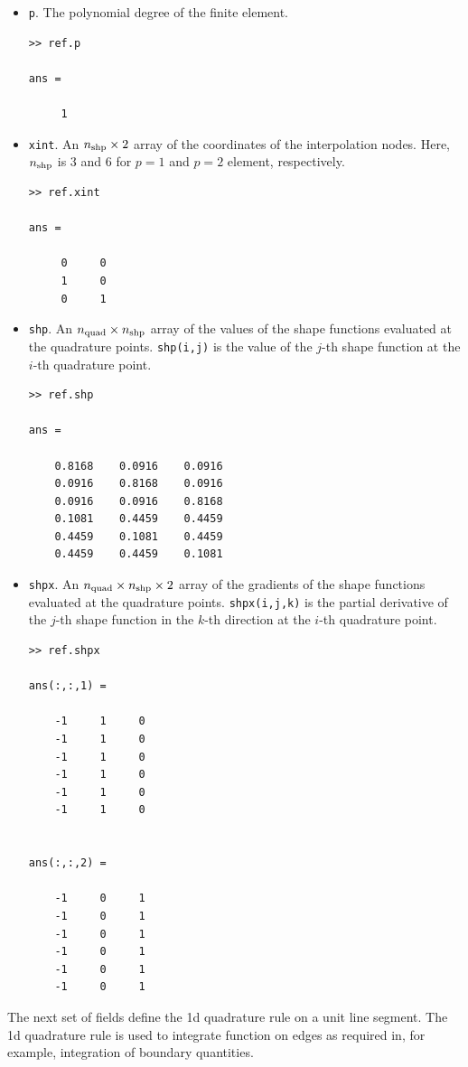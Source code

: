 \documentclass[openany,preprint,11pt]{article}
\begin{document}
\begin{itemize}
\item \texttt{p}. The polynomial degree of the finite element.
\begin{verbatim}
>> ref.p

ans =

     1
\end{verbatim}
\item \texttt{xint}. An $n_{\rm shp} \times 2$ array of the coordinates of the interpolation nodes.  Here, $n_{\rm shp}$ is 3 and 6 for $p=1$ and $p=2$ element, respectively.
\begin{verbatim}
>> ref.xint

ans =

     0     0
     1     0
     0     1
\end{verbatim}
\item \texttt{shp}. An $n_{\rm quad} \times n_{\rm shp}$ array of the values of the shape functions evaluated at the quadrature points. \texttt{shp(i,j)} is the value of the $j$-th shape function at the $i$-th quadrature point.
\begin{verbatim}
>> ref.shp

ans =

    0.8168    0.0916    0.0916
    0.0916    0.8168    0.0916
    0.0916    0.0916    0.8168
    0.1081    0.4459    0.4459
    0.4459    0.1081    0.4459
    0.4459    0.4459    0.1081
\end{verbatim}
\item \texttt{shpx}. An $n_{\rm quad} \times n_{\rm shp} \times 2$ array of the gradients of the shape functions evaluated at the quadrature points. \texttt{shpx(i,j,k)} is the partial derivative of the $j$-th shape function in the $k$-th direction at the $i$-th quadrature point.
\begin{verbatim}
>> ref.shpx

ans(:,:,1) =

    -1     1     0
    -1     1     0
    -1     1     0
    -1     1     0
    -1     1     0
    -1     1     0


ans(:,:,2) =

    -1     0     1
    -1     0     1
    -1     0     1
    -1     0     1
    -1     0     1
    -1     0     1
\end{verbatim}
\end{itemize}
The next set of fields define the 1d quadrature rule on a unit line segment.  The 1d quadrature rule is used to integrate function on edges as required in, for example, integration of boundary quantities.
\end{document}

